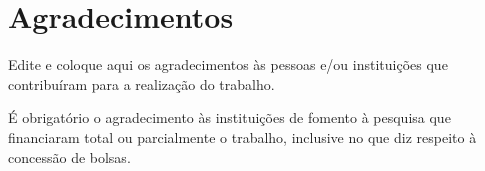 

\chapter{Agradecimentos}\label{sec:agradecimentos}
Edite e coloque aqui os agradecimentos às pessoas e/ou instituições que contribuíram para a realização do trabalho.

É obrigatório o agradecimento às instituições de fomento à pesquisa que financiaram total ou parcialmente o trabalho, inclusive no que diz respeito à concessão de bolsas.

